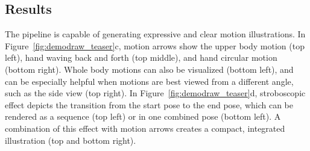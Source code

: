 
\subsection{Results}
The \systemname{} pipeline is capable of generating expressive and clear motion illustrations. In Figure~\ref{fig:demodraw_teaser}c, motion arrows show the upper body motion (top left), hand waving back and forth (top middle), and hand circular motion (bottom right). Whole body motions can also be visualized (bottom left), and can be especially helpful when motions are best viewed from a different angle, such as the side view (top right).
%
In Figure~\ref{fig:demodraw_teaser}d, stroboscopic effect depicts the transition from the start pose to the end pose, which can be rendered as a sequence (top left) or in one combined pose (bottom left). A combination of this effect with motion arrows creates a compact, integrated illustration (top and bottom right).

